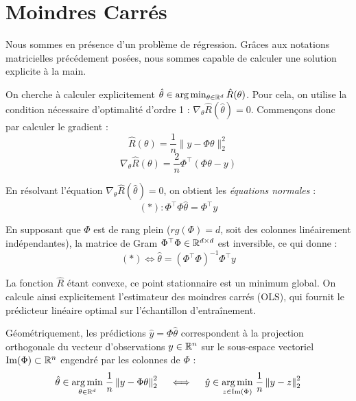 
\section{Moindres Carrés}

Nous sommes en présence d'un problème de régression. Grâces aux notations matricielles précédement posées, nous sommes capable de calculer une solution explicite à la main. 

On cherche à calculer explicitement $\hat{\theta} \in \arg \min_{\theta \in \mathbb{R}^d} \hat{R}(\theta)$. Pour cela, on utilise la condition nécessaire d'optimalité d'ordre 1 : $\nabla_\theta \hat{R}(\hat{\theta}) = 0$. Commençons donc par calculer le gradient : 
\begin{equation}
    \hat{R}(\theta) = \frac{1}{n} \| y - \Phi \theta \|_2^2
\end{equation}
\begin{equation}
    \nabla_\theta \hat{R}(\theta) = \frac{2}{n} \Phi^\top (\Phi \theta - y)
\end{equation}

En résolvant l'équation $\nabla_\theta \hat{R}(\hat{\theta}) = 0$, on obtient les \emph{équations normales} :
\begin{equation}
    (*) : \Phi^\top \Phi \hat{\theta} = \Phi^\top y
\end{equation}

En supposant que $\Phi$ est de rang plein ($rg(\Phi) = d$, soit des colonnes linéairement indépendantes), la matrice de Gram $\Phi^\top \Phi \in \mathbb{R}^{d \times d}$ est inversible, ce qui donne :
\begin{equation}
    (*) \iff \boxed{\hat{\theta} = \left( \Phi^\top \Phi\right)^{-1} \Phi^\top y}
\end{equation}

La fonction $\hat{R}$ étant convexe, ce point stationnaire est un minimum global.
On calcule ainsi explicitement l'estimateur des moindres carrés (OLS), qui fournit le prédicteur linéaire optimal sur l'échantillon d'entraînement.

\begin{proposition}
    Géométriquement, les prédictions $\hat{y} = \Phi \hat{\theta}$ correspondent à la projection orthogonale du vecteur d'observations $y \in \mathbb{R}^n$ sur le sous-espace vectoriel $\operatorname{Im}(\Phi) \subset \mathbb{R}^n$ engendré par les colonnes de $\Phi$ :
    \begin{equation}
        \hat{\theta} \in \underset{\theta \in \mathbb{R}^d}{\arg \min} \; \frac{1}{n} \left\| y - \Phi \theta \right\|_2^2 \quad
        \iff \quad \hat{y} \in \underset{z \in \operatorname{Im}(\Phi)}{\arg \min} \; \frac{1}{n} \left\| y - z \right\|_2^2
    \end{equation}
\end{proposition}

